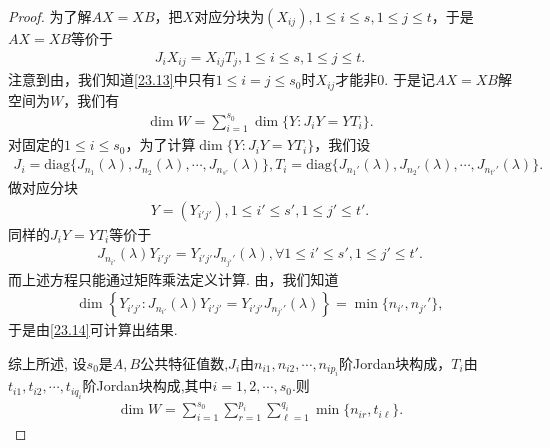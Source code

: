 \documentclass[../../main.tex]{subfiles}
\begin{document}
\begin{proof}
为了解$AX = XB$，把$X$对应分块为$(X_{ij}), 1\leqslant i\leqslant s, 1\leqslant j\leqslant t$，于是$AX = XB$等价于
\begin{align}
J_iX_{ij} = X_{ij}T_j, 1\leqslant i\leqslant s, 1\leqslant j\leqslant t. \label{23.13}
\end{align}
注意到由，我们知道\eqref{23.13}中只有$1\leqslant i = j\leqslant s_0$时$X_{ij}$才能非$0$. 于是记$AX = XB$解空间为$W$，我们有
\begin{align}
\dim W = \sum_{i = 1}^{s_0}\dim\{Y : J_iY = YT_i\}. \label{23.14}
\end{align}
对固定的$1\leqslant i\leqslant s_0$，为了计算$\dim\{Y : J_iY = YT_i\}$，我们设
\begin{align*}
J_i = \mathrm{diag}\{J_{n_1}(\lambda), J_{n_2}(\lambda), \cdots, J_{n_{s'}}(\lambda)\}, T_i = \mathrm{diag}\{J_{n_1'}(\lambda), J_{n_2'}(\lambda), \cdots, J_{n_{t'}'}(\lambda)\}.
\end{align*}
做对应分块
\begin{align*}
Y = (Y_{i'j'}), 1\leqslant i'\leqslant s', 1\leqslant j'\leqslant t'.
\end{align*}
同样的$J_iY = YT_i$等价于
\begin{align}
J_{n_{i'}}(\lambda)Y_{i'j'} = Y_{i'j'}J_{n_{j'}'}(\lambda), \forall 1\leqslant i'\leqslant s', 1\leqslant j'\leqslant t'. \label{23.15}
\end{align}
而上述方程只能通过矩阵乘法定义计算. 由，我们知道
\begin{align*}
\dim\left\{Y_{i'j'} : J_{n_{i'}}(\lambda)Y_{i'j'} = Y_{i'j'}J_{n_{j'}'}(\lambda)\right\} = \min\{n_{i'}, n_{j'}'\},
\end{align*}
于是由\eqref{23.14}可计算出结果. 

综上所述,
设$s_0$是$A, B$公共特征值数,$J_i$由$n_{i1}, n_{i2}, \cdots, n_{ip_i}$阶Jordan块构成，$T_i$由$t_{i1}, t_{i2}, \cdots, t_{iq_i}$阶Jordan块构成,其中$i=1,2,\cdots,s_0$.则
\begin{align}
\dim W = \sum_{i = 1}^{s_0}\sum_{r = 1}^{p_i}\sum_{\ell = 1}^{q_i}\min\{n_{ir}, t_{i\ell}\}. \label{23.16}
\end{align}

\end{proof}
\end{document}
